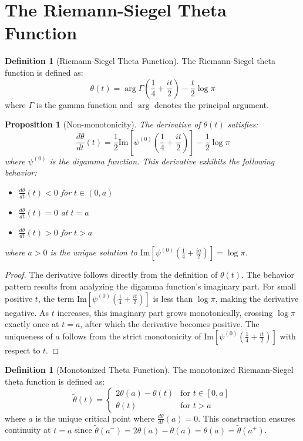 \documentclass{article}
\newtheorem{proposition}[theorem]{Proposition}
\theoremstyle{definition}
\newtheorem{definition}[theorem]{Definition}
\begin{document}
\section{The Riemann-Siegel Theta Function}

\begin{definition}[Riemann-Siegel Theta Function]
The Riemann-Siegel theta function is defined as:
\begin{equation}
\theta(t) = \arg\Gamma\left(\frac{1}{4} + \frac{it}{2}\right) - \frac{t}{2}\log\pi
\end{equation}
where $\Gamma$ is the gamma function and $\arg$ denotes the principal argument.
\end{definition}

\begin{proposition}[Non-monotonicity]
The derivative of $\theta(t)$ satisfies:
\begin{equation}
\frac{d\theta}{dt}(t) = \frac{1}{2}\text{Im}\left[\psi^{(0)}\left(\frac{1}{4} + \frac{it}{2}\right)\right] - \frac{1}{2}\log\pi
\end{equation}
where $\psi^{(0)}$ is the digamma function. This derivative exhibits the following behavior:
\begin{itemize}
\item $\frac{d\theta}{dt}(t) < 0$ for $t \in (0,a)$
\item $\frac{d\theta}{dt}(t) = 0$ at $t = a$
\item $\frac{d\theta}{dt}(t) > 0$ for $t > a$
\end{itemize}
where $a > 0$ is the unique solution to $\text{Im}[\psi^{(0)}(\frac{1}{4} + \frac{ia}{2})] = \log\pi$.
\end{proposition}

\begin{proof}
The derivative follows directly from the definition of $\theta(t)$. The behavior pattern results from analyzing the digamma function's imaginary part. For small positive $t$, the term $\text{Im}[\psi^{(0)}(\frac{1}{4} + \frac{it}{2})]$ is less than $\log\pi$, making the derivative negative. As $t$ increases, this imaginary part grows monotonically, crossing $\log\pi$ exactly once at $t = a$, after which the derivative becomes positive. The uniqueness of $a$ follows from the strict monotonicity of $\text{Im}[\psi^{(0)}(\frac{1}{4} + \frac{it}{2})]$ with respect to $t$.
\end{proof}

\begin{definition}[Monotonized Theta Function]
The monotonized Riemann-Siegel theta function is defined as:
\begin{equation}
\tilde{\theta}(t) = 
\begin{cases}
2\theta(a) - \theta(t) & \text{for } t \in [0,a] \\
\theta(t) & \text{for } t > a
\end{cases}
\end{equation}
where $a$ is the unique critical point where $\frac{d\theta}{dt}(a) = 0$. This construction ensures continuity at $t = a$ since $\tilde{\theta}(a^-) = 2\theta(a) - \theta(a) = \theta(a) = \tilde{\theta}(a^+)$.
\end{definition}
\end{document}
